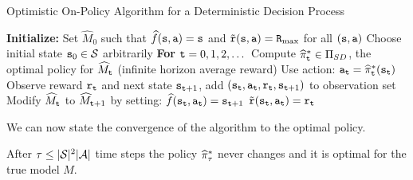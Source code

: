 \begin{algorithm}[H]
\caption{Optimistic On-Policy Algorithm for a Deterministic Decision Process}
\begin{algorithmic}[1]
\State \textbf{Initialize:}
\State Set $\widehat{M}_0$ such that $\widehat{f}({\tt s}, {\tt a}) = {\tt s}$ and $\tilde{{\tt r}}({\tt s}, {\tt a}) = {\tt R}_{\max }$ for all $({\tt s}, {\tt a})$
\State Choose initial state ${\tt s}_0 \in \mathcal{S}$ arbitrarily
\State \textbf{For} ${\tt t} = 0,1,2,\dots$
\State \quad Compute $\widehat{\pi}^*_{\tt t} \in \Pi_{SD}$, the optimal policy for $\widehat{M}_{\tt t}$ (infinite horizon average reward)
\State \quad Use action: ${\tt a}_{\tt t} = \widehat{\pi}^*_{\tt t}({\tt s}_{\tt t})$
\State \quad Observe reward ${\tt r}_{\tt t}$ and next state ${\tt s}_{{\tt t}+1}$, add $({\tt s}_{\tt t}, {\tt a}_{\tt t}, {\tt r}_{\tt t}, {\tt s}_{{\tt t}+1})$ to observation set
\State \quad Modify $\widehat{M}_{\tt t}$ to $\widehat{M}_{{\tt t}+1}$ by setting:
\State \quad \quad $\widehat{f}({\tt s}_{\tt t}, {\tt a}_{\tt t}) = {\tt s}_{{\tt t}+1}$
\State \quad \quad $\tilde{{\tt r}}({\tt s}_{\tt t}, {\tt a}_{\tt t}) = {\tt r}_{\tt t}$
\end{algorithmic}
\end{algorithm}


We can now state the convergence of the algorithm to the optimal
policy.

\begin{theorem}
After $\tau\leq|\mathcal{S}|^2|\mathcal{A}|$ time steps the policy
$\widehat{\pi}^*_\tau$ never changes and it is optimal for the true model $M$.
\end{theorem}

